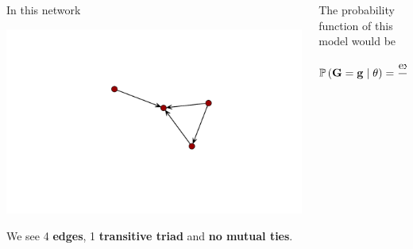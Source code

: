 \documentclass[aspectratio=169, 9pt]{beamer}\usepackage[]{graphicx}\usepackage[]{color}
\newenvironment{knitrout}{}{} %
\begin{document}
\begin{frame}[label=ergm-toyexample]

\begin{columns}[c]

\begin{column}[c]{.4\linewidth}

In this network\linebreak

\begin{knitrout}
\color{fgcolor}

{\centering \includegraphics[width=.9\linewidth]{figure/simple-model-1} 

}



\end{knitrout}

\pause

We see 4 \textbf{edges}, 1 \textbf{transitive triad} and \textbf{no mutual ties}.

\end{column}

\pause

\begin{column}[c]{.4\linewidth}

The probability function of this model would be

\footnotesize

\begin{equation*}
\Prcond{\Graph = \graph}{\theta} = \frac{\exp{4\theta_{edges} + \theta_{ttriads} \textcolor{lightgray}{+ 0\theta_{mutual}}}}{%
\sum_{\graph'\in\GRAPH} \exp{\transpose{\theta} \sufstats{\graph'}}}
\end{equation*}


\end{column}
\end{columns}
\end{frame}
\end{document}
